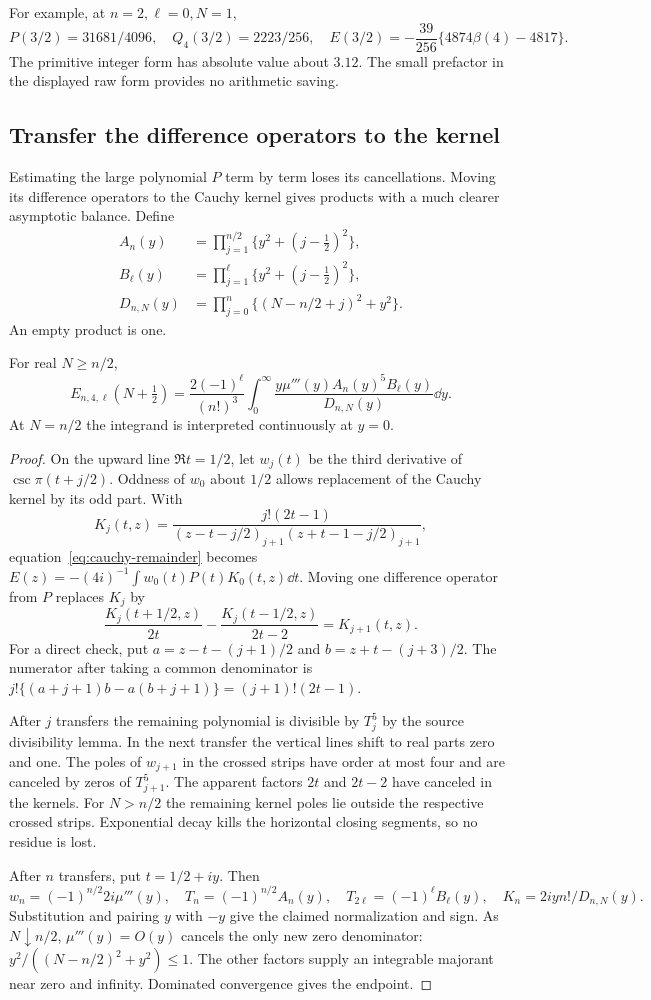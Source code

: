 For example, at $n=2,\ell=0,N=1$,
\[
 P(3/2)=31681/4096,\quad Q_4(3/2)=2223/256,
 \quad E(3/2)=-\frac{39}{256}\{4874\beta(4)-4817\}.
\]
The primitive integer form has absolute value about $3.12$. The small
prefactor in the displayed raw form provides no arithmetic saving.

\subsection{Transfer the difference operators to the kernel}
Estimating the large polynomial $P$ term by term loses its cancellations.
Moving its difference operators to the Cauchy kernel gives products with
a much clearer asymptotic balance. Define
\begin{align*}
 A_n(y)&=\prod_{j=1}^{n/2}\{y^2+(j-\tfrac12)^2\},\\
 B_\ell(y)&=\prod_{j=1}^{\ell}\{y^2+(j-\tfrac12)^2\},\\
 D_{n,N}(y)&=\prod_{j=0}^{n}\{(N-n/2+j)^2+y^2\}.
\end{align*}
An empty product is one.

\begin{proposition}\label{prop:product-integral}
For real $N\ge n/2$,
\[
 E_{n,4,\ell}(N+\tfrac12)
 =\frac{2(-1)^\ell}{(n!)^3}
   \int_0^\infty\frac{y\mu'''(y)A_n(y)^5B_\ell(y)}{D_{n,N}(y)}\dd y.
\]
At $N=n/2$ the integrand is interpreted continuously at $y=0$.
\end{proposition}
\begin{proof}
On the upward line $\Re t=1/2$, let $w_j(t)$ be the third derivative
of $\csc\pi(t+j/2)$. Oddness of $w_0$ about $1/2$ allows replacement
of the Cauchy kernel by its odd part. With
\[
 K_j(t,z)=\frac{j!(2t-1)}{(z-t-j/2)_{j+1}(z+t-1-j/2)_{j+1}},
\]
equation~\eqref{eq:cauchy-remainder} becomes
$E(z)=-(4i)^{-1}\int w_0(t)P(t)K_0(t,z)\dd t$.
Moving one difference operator from $P$ replaces $K_j$ by
\[
 \frac{K_j(t+1/2,z)}{2t}-\frac{K_j(t-1/2,z)}{2t-2}=K_{j+1}(t,z).
\]
For a direct check, put $a=z-t-(j+1)/2$ and
$b=z+t-(j+3)/2$. The numerator after taking a common denominator
is $j!\{(a+j+1)b-a(b+j+1)\}=(j+1)!(2t-1)$.

After $j$ transfers the remaining polynomial is divisible by $T_j^5$
by the source divisibility lemma. In the next transfer the vertical
lines shift to real parts zero and one. The poles of $w_{j+1}$ in
the crossed strips have order at most four and are canceled by zeros
of $T_{j+1}^5$. The apparent factors $2t$ and $2t-2$ have canceled
in the kernels. For $N>n/2$ the remaining kernel poles lie outside
the respective crossed strips. Exponential decay kills the horizontal
closing segments, so no residue is lost.

After $n$ transfers, put $t=1/2+iy$. Then
\[
 w_n=(-1)^{n/2}2i\mu'''(y),\quad
 T_n=(-1)^{n/2}A_n(y),\quad T_{2\ell}=(-1)^\ell B_\ell(y),
 \quad K_n=2iy n!/D_{n,N}(y).
\]
Substitution and pairing $y$ with $-y$ give the claimed normalization
and sign. As $N\downarrow n/2$, $\mu'''(y)=O(y)$ cancels the only
new zero denominator: $y^2/((N-n/2)^2+y^2)\le1$. The other factors
supply an integrable majorant near zero and infinity. Dominated
convergence gives the endpoint.
\end{proof}


